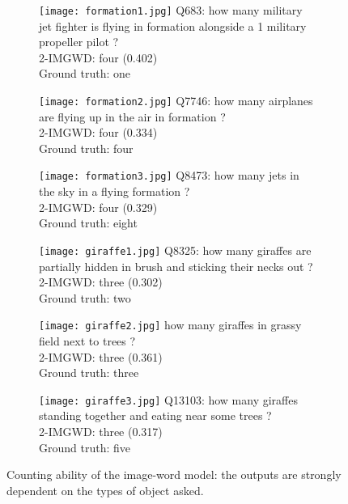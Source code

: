 \begin{figure}
\footnotesize
\begin{subfigure}[t]{0.3\textwidth}
    \texttt{[image: formation1.jpg]}
    Q683: how many military jet fighter is flying in formation alongside a 1 military propeller pilot ?\\
    2-IMGWD: four (0.402)\\
    Ground truth: one\\
\end{subfigure}
\quad
\begin{subfigure}[t]{0.3\textwidth}
    \texttt{[image: formation2.jpg]}
    Q7746: how many airplanes are flying up in the air in formation ?\\
    2-IMGWD: four (0.334)\\
    Ground truth: four\\
\end{subfigure}
\quad
\begin{subfigure}[t]{0.3\textwidth}
    \texttt{[image: formation3.jpg]}
    Q8473: how many jets in the sky in a flying formation ?\\
    2-IMGWD: four (0.329)\\
    Ground truth: eight\\
\end{subfigure}

\begin{subfigure}[t]{0.3\textwidth}
    \texttt{[image: giraffe1.jpg]}
    Q8325: how many giraffes are partially hidden in brush and sticking their necks out ?\\
    2-IMGWD: three (0.302)\\
    Ground truth: two
\end{subfigure}
\quad
\begin{subfigure}[t]{0.3\textwidth}
    \texttt{[image: giraffe2.jpg]}
    how many giraffes in grassy field next to trees ?\\
    2-IMGWD: three (0.361)\\
    Ground truth: three
\end{subfigure}
\quad
\begin{subfigure}[t]{0.3\textwidth}
    \texttt{[image: giraffe3.jpg]}
    Q13103: how many giraffes standing together and eating near some trees ?\\
    2-IMGWD: three (0.317)\\
    Ground truth: five
\end{subfigure}

\caption{Counting ability of the image-word model: the outputs are strongly dependent on the types of object asked.}
\label{fig:cocoqa_number}
\end{figure}

